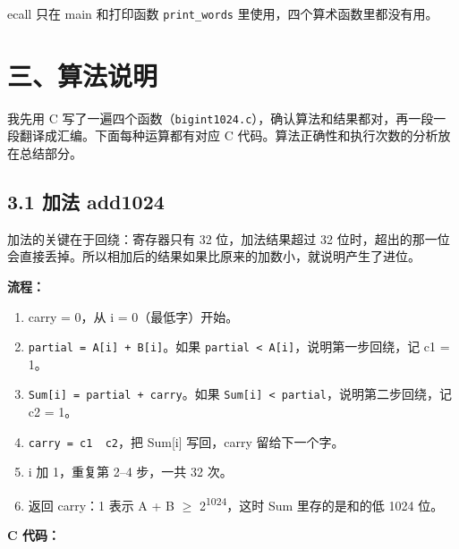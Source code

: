 \documentclass[11pt,a4paper]{ctexart}
\providecommand{\tightlist}{\setlength{\itemsep}{0pt}\setlength{\parskip}{0pt}}
\begin{document}
ecall 只在 main 和打印函数 \texttt{print\_words}
里使用，四个算术函数里都没有用。

\FloatBarrier

\hypertarget{ux4e09ux7b97ux6cd5ux8bf4ux660e}{%
\section{三、算法说明}\label{ux4e09ux7b97ux6cd5ux8bf4ux660e}}

我先用 C
写了一遍四个函数（\texttt{bigint1024.c}），确认算法和结果都对，再一段一段翻译成汇编。下面每种运算都有对应
C 代码。算法正确性和执行次数的分析放在总结部分。

\FloatBarrier

\hypertarget{ux52a0ux6cd5-add1024}{%
\subsection{3.1 加法 add1024}\label{ux52a0ux6cd5-add1024}}

加法的关键在于回绕：寄存器只有 32 位，加法结果超过 32
位时，超出的那一位会直接丢掉。所以相加后的结果如果比原来的加数小，就说明产生了进位。


\textbf{流程：}

\begin{enumerate}
\def\labelenumi{\arabic{enumi}.}
\tightlist
\item
  carry = 0，从 i = 0（最低字）开始。
\item
  \texttt{partial\ =\ A{[}i{]}\ +\ B{[}i{]}}。如果
  \texttt{partial\ \textless{}\ A{[}i{]}}，说明第一步回绕，记 c1 = 1。
\item
  \texttt{Sum{[}i{]}\ =\ partial\ +\ carry}。如果
  \texttt{Sum{[}i{]}\ \textless{}\ partial}，说明第二步回绕，记 c2 = 1。
\item
  \texttt{carry\ =\ c1\ \textbar{}\ c2}，把 Sum{[}i{]} 写回，carry
  留给下一个字。
\item
  i 加 1，重复第 2--4 步，一共 32 次。
\item
  返回 carry：1 表示 A + B \ensuremath{\geq}
  2\textsuperscript{1024}，这时 Sum 里存的是和的低 1024 位。
\end{enumerate}


\textbf{C 代码：}
\end{document}
